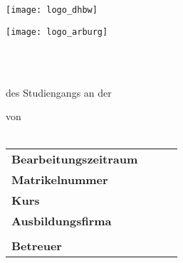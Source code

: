 \begin{minipage}[ht]{35mm}
	\texttt{[image: logo\_dhbw]}
\end{minipage}
\hfill
\begin{minipage}[ht]{30mm}
	\texttt{[image: logo\_arburg]}
\end{minipage}
\begin{center}
	\vspace{4.5\baselineskip}
	\LARGE{\textbf{\titel}}\\
	\vspace{1.5\baselineskip}
	\large{\textbf{\artDerArbeit}}\\
	\large\textbf{\arbeit}
	\vspace{1.0\baselineskip}

	des Studiengangs \studiengang an der\\ 
	\dhbw
	\vspace{1.0\baselineskip}
	
	von\\
	\autor \\
	\vspace{1.0\baselineskip}
	\abgabedatum
	\vspace{2.5\baselineskip}
\end{center}

\begin{flushleft}
	\centering
	\begin{tabular}{llll}
		\textbf{Bearbeitungszeitraum} &  & \quad\quad\quad\quad\quad\zeitraum & \\
		\textbf{Matrikelnummer} & & \quad\quad\quad\quad\quad\matrikelnr &\\
		\textbf{Kurs} & & \quad\quad\quad\quad\quad\kurs &\\
		\textbf{Ausbildungsfirma} & & \quad\quad\quad\quad\quad\firma &\\
		& & \quad\quad\quad\quad\quad\firmenadresse&\\
		\textbf{Betreuer} & & \quad\quad\quad\quad\quad\betreuer &\\
	\end{tabular}
\end{flushleft}